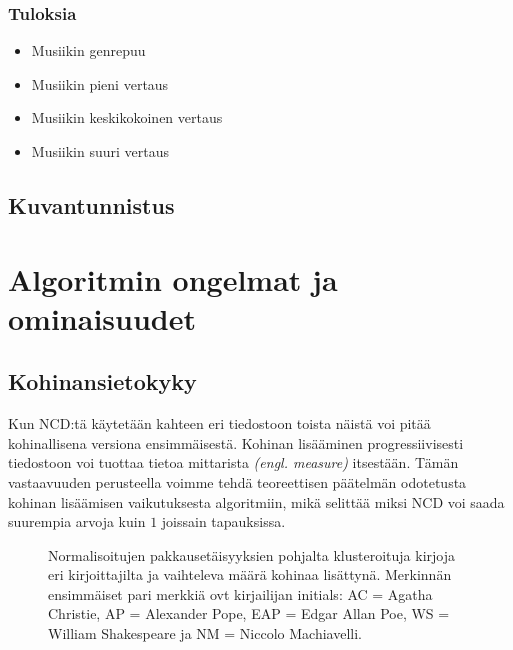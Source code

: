 \documentclass[12pt,finnish,draft]{tktltiki2}
\theoremstyle{definition}
\theoremstyle{remark}
\newcommand{\engl}[1]{\emph{(engl. #1)}}
\begin{document}
    \subsubsection{Tuloksia} %
    \label{ssub:tuloksia}
      \begin{itemize}
        \item Musiikin genrepuu
        \item Musiikin pieni vertaus
        \item Musiikin keskikokoinen vertaus
        \item Musiikin suuri vertaus
      \end{itemize}

  \subsection{Kuvantunnistus} %
  \label{sub:kuvantunnistus}


\section{Algoritmin ongelmat ja ominaisuudet} %
\label{sec:algoritmin_ongelmat_ja_ominaisuudet}
  \subsection{Kohinansietokyky} %
  \label{sub:kohinansietokyky}

    Kun NCD:tä käytetään kahteen eri tiedostoon toista näistä voi pitää kohinallisena versiona ensimmäisestä.
    Kohinan lisääminen progressiivisesti tiedostoon voi tuottaa tietoa mittarista \engl{measure} itsestään.
    Tämän vastaavuuden perusteella voimme tehdä teoreettisen päätelmän odotetusta kohinan lisäämisen vaikutuksesta algoritmiin, mikä selittää miksi NCD voi saada suurempia arvoja kuin $1$ joissain tapauksissa. \cite{4167725}

    \begin{figure}[t]
      \begin{center}
      \end{center}
      \caption{Normalisoitujen pakkausetäisyyksien pohjalta klusteroituja kirjoja eri kirjoittajilta ja vaihteleva määrä kohinaa lisättynä. Merkinnän ensimmäiset pari merkkiä ovt kirjailijan initials: AC = Agatha Christie, AP = Alexander Pope, EAP = Edgar Allan Poe, WS = William Shakespeare ja NM = Niccolo Machiavelli.
      \cite{4167725}}
      \label{fig:(bzip2-best)}
    \end{figure}
\end{document}
